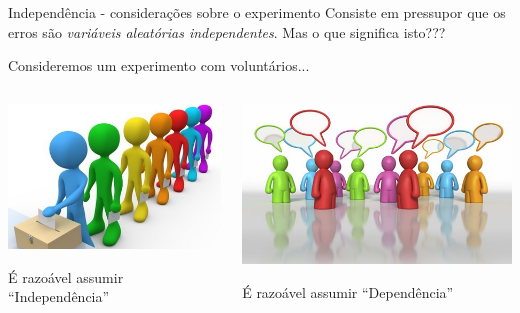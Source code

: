 \documentclass{bredelebeamer}
\begin{document}
\begin{frame}
\begin{block}{Independência - considerações sobre o experimento}
Consiste em pressupor que os erros são \textit{variáveis aleatórias
  independentes}. Mas o que significa isto???
\end{block}

\pause
\vspace{.5cm}

Consideremos um experimento com voluntários... \\

\vspace{.5cm}

\begin{columns}
\begin{column}{0.5\textwidth}
\centering
\includegraphics[scale=1]{images/independencia.jpg}
\begin{center}
É razoável assumir ``Independência''
\end{center}
\end{column}

\begin{column}{0.5\textwidth}
\centering
\includegraphics[scale=.22]{images/dependente.jpg}
\begin{center}
É razoável assumir ``Dependência''
\end{center}
\end{column}
\end{columns}
\end{frame}
\end{document}
